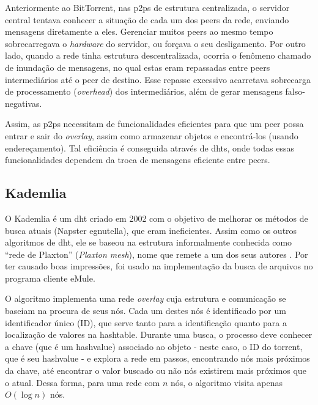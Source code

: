 \begin{itemize}
Anteriormente ao BitTorrent, nas \glspl*{p2p} de estrutura centralizada, o servidor
central tentava conhecer a situação de cada um dos \glspl*{peer} da rede, enviando
mensagens diretamente a eles. Gerenciar muitos \glspl*{peer} ao mesmo tempo
sobrecarregava o \emph{hardware} do servidor, ou forçava o seu desligamento. Por outro
lado, quando a rede tinha estrutura descentralizada, ocorria o fenômeno chamado de
inundação de mensagens, no qual estas eram repassadas entre \glspl*{peer}
intermediários até o \gls*{peer} de destino. Esse repasse excessivo acarretava
sobrecarga de processamento (\emph{overhead}) dos intermediários, além de gerar
mensagens falso-negativas.

Assim, as \glspl*{p2p} necessitam de funcionalidades eficientes para que um \gls*{peer}
possa entrar e sair do \emph{overlay}, assim como armazenar objetos e encontrá-los
(usando endereçamento). Tal eficiência é conseguida através de \glspl{dht}, onde todas
essas funcionalidades dependem da troca de mensagens eficiente entre \glspl*{peer}.

\begin{figure}[H]
    \centering
\end{figure}

\subsection*{Kademlia}

O Kademlia é um \gls*{dht} criado em 2002 \cite{artigo:kademlia} com o objetivo de
melhorar os métodos de busca atuais (Napster e\gls*{gnutella}), que eram ineficientes.
Assim como os outros algoritmos de \gls*{dht}, ele se baseou na estrutura informalmente
conhecida como ``rede de Plaxton'' (\emph{Plaxton mesh}), nome que remete a um dos seus
autores \cite{artigo:dht}. Por ter causado boas impressões, foi usado na implementação
da busca de arquivos no programa cliente eMule.

O algoritmo implementa uma rede \emph{overlay} cuja estrutura e comunicação se baseiam
na procura de seus nós. Cada um destes nós é identificado por um identificador único
(ID), que serve tanto para a identificação quanto para a localização de valores na
\gls*{hashtable}. Durante uma busca, o processo deve conhecer a chave (que é um
\gls*{hashvalue}) associado ao objeto - neste caso, o ID do \gls*{torrent}, que é seu
\gls*{hashvalue} - e explora a rede em passos, encontrando nós mais próximos da chave,
até encontrar o valor buscado ou não nós existirem mais próximos que o atual. Dessa
forma, para uma rede com $n$ nós, o algoritmo visita apenas $O(\log n)$ nós.


\end{itemize}
